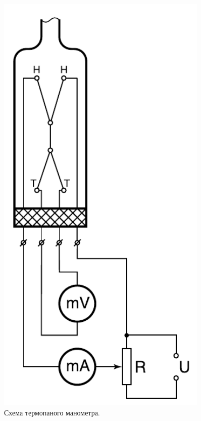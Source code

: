 \documentclass[a4paper, 12pt]{article}
\begin{document}
    \begin{figure}[h]
    \centering
    \begin{minipage}{0.3\textwidth}
        \centering
        \includegraphics[width=0.9\textwidth]{termoparni_monometr}
        \caption{Схема термопаного манометра.}
        \label{ris:termoparni_monometr}
    \end{minipage}\hfill
    \begin{minipage}{0.7\textwidth}

\end{minipage}
\end{figure}
\end{document}
